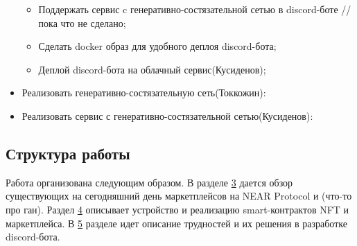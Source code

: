 \begin{itemize}
\begin{itemize}
        \item Поддержать сервис c генеративно-состязательной сетью в discord-боте // пока что не сделано;
        \item Сделать docker образ для удобного деплоя discord-бота;
        \item Деплой discord-бота на облачный сервис(Кусиденов);
    \end{itemize}
    \item Реализовать генеративно-состязательную сеть(Токкожин):
    \item Реализовать сервис с генеративно-состязательной сетью(Кусиденов):
\end{itemize}

\subsection{Структура работы}

Работа организована следующим образом. В разделе \hyperref[section.3]{\color{blue} 3} дается обзор существующих на сегодняшний день маркетплейсов на NEAR Protocol и (что-то про ган). Раздел \hyperref[section.4]{\color{blue} 4} описывает устройство и реализацию smart-контрактов NFT и маркетплейса. В \hyperref[section.5]{\color{blue} 5} разделе идет описание трудностей и их решения в разработке discord-бота.

